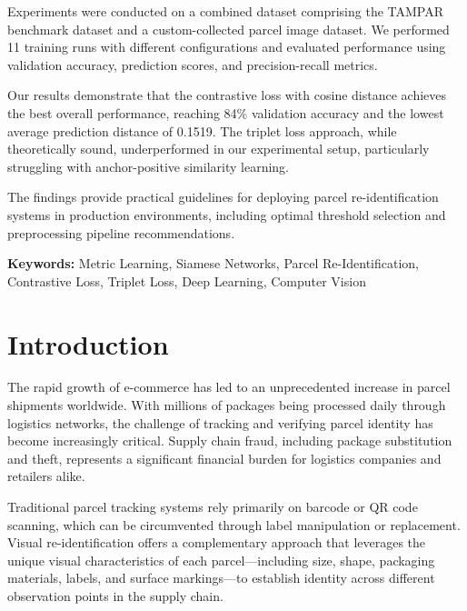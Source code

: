 \documentclass[12pt,a4paper]{article}
\begin{document}
Experiments were conducted on a combined dataset comprising the TAMPAR benchmark dataset and a custom-collected parcel image dataset. We performed 11 training runs with different configurations and evaluated performance using validation accuracy, prediction scores, and precision-recall metrics.

Our results demonstrate that the contrastive loss with cosine distance achieves the best overall performance, reaching 84\% validation accuracy and the lowest average prediction distance of 0.1519. The triplet loss approach, while theoretically sound, underperformed in our experimental setup, particularly struggling with anchor-positive similarity learning.

The findings provide practical guidelines for deploying parcel re-identification systems in production environments, including optimal threshold selection and preprocessing pipeline recommendations.

\textbf{Keywords:} Metric Learning, Siamese Networks, Parcel Re-Identification, Contrastive Loss, Triplet Loss, Deep Learning, Computer Vision

\newpage
\tableofcontents

\newpage
\section{Introduction}
\label{sec:introduction}

The rapid growth of e-commerce has led to an unprecedented increase in parcel shipments worldwide. With millions of packages being processed daily through logistics networks, the challenge of tracking and verifying parcel identity has become increasingly critical. Supply chain fraud, including package substitution and theft, represents a significant financial burden for logistics companies and retailers alike.

Traditional parcel tracking systems rely primarily on barcode or QR code scanning, which can be circumvented through label manipulation or replacement. Visual re-identification offers a complementary approach that leverages the unique visual characteristics of each parcel—including size, shape, packaging materials, labels, and surface markings—to establish identity across different observation points in the supply chain.
\end{document}
